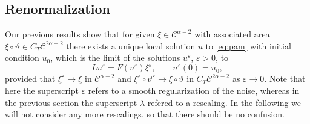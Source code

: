\documentclass[11pt,a4paper]{article}
\theoremstyle{remark}
\newcommand{\CC}{\ensuremath{\mathscr{C}}}
\begin{document}
\subsection{Renormalization}

Our previous results show that for given $\xi \in \CC^{\alpha -2}$ with associated area $\xi \circ \vartheta \in C_{T} \CC^{2 \alpha -2}$
there exists a unique local solution $u$ to {\eqref{eq:pam}} with initial
condition $u_{0}$, which is the limit of the solutions $u^{\varepsilon}$,
$\varepsilon >0$, to
\[
   L u^{\varepsilon} =F ( u^{\varepsilon} ) \xi^{\varepsilon} , \hspace{2em} u^{\varepsilon} ( 0 ) =u_{0},
\]
provided that $\xi^{\varepsilon} \rightarrow \xi$ in $\CC^{\alpha -2}$
and $\xi^{\varepsilon} \circ \vartheta^{\varepsilon} \rightarrow \xi \circ \vartheta$ in $C_{T} \CC^{2 \alpha -2}$ as $\varepsilon \rightarrow 0$. Note that here the superscript $\varepsilon$ refers to a smooth regularization of the noise, whereas in the previous section the
superscript $\lambda$ refered to a rescaling. In the following we will not
consider any more rescalings, so that there should be no confusion.
\end{document}
